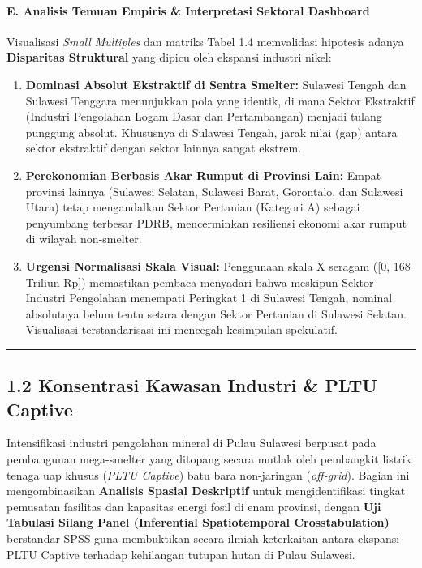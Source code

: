 \documentclass[
]{article}
\providecommand{\tightlist}{%
  \setlength{\itemsep}{0pt}\setlength{\parskip}{0pt}}
\begin{document}
\paragraph{E. Analisis Temuan Empiris \& Interpretasi Sektoral
Dashboard}\label{e.-analisis-temuan-empiris-interpretasi-sektoral-dashboard}

Visualisasi \emph{Small Multiples} dan matriks Tabel 1.4 memvalidasi
hipotesis adanya \textbf{Disparitas Struktural} yang dipicu oleh
ekspansi industri nikel:

\begin{enumerate}
\def\labelenumi{\arabic{enumi}.}
\tightlist
\item
  \textbf{Dominasi Absolut Ekstraktif di Sentra Smelter:} Sulawesi
  Tengah dan Sulawesi Tenggara menunjukkan pola yang identik, di mana
  Sektor Ekstraktif (Industri Pengolahan Logam Dasar dan Pertambangan)
  menjadi tulang punggung absolut. Khususnya di Sulawesi Tengah, jarak
  nilai (gap) antara sektor ekstraktif dengan sektor lainnya sangat
  ekstrem.
\item
  \textbf{Perekonomian Berbasis Akar Rumput di Provinsi Lain:} Empat
  provinsi lainnya (Sulawesi Selatan, Sulawesi Barat, Gorontalo, dan
  Sulawesi Utara) tetap mengandalkan Sektor Pertanian (Kategori A)
  sebagai penyumbang terbesar PDRB, mencerminkan resiliensi ekonomi akar
  rumput di wilayah non-smelter.
\item
  \textbf{Urgensi Normalisasi Skala Visual:} Penggunaan skala X seragam
  ({[}0, 168 Triliun Rp{]}) memastikan pembaca menyadari bahwa meskipun
  Sektor Industri Pengolahan menempati Peringkat 1 di Sulawesi Tengah,
  nominal absolutnya belum tentu setara dengan Sektor Pertanian di
  Sulawesi Selatan. Visualisasi terstandarisasi ini mencegah kesimpulan
  spekulatif.
\end{enumerate}

\begin{center}\rule{0.5\linewidth}{0.5pt}\end{center}

\subsection{1.2 Konsentrasi Kawasan Industri \& PLTU
Captive}\label{konsentrasi-kawasan-industri-pltu-captive}

Intensifikasi industri pengolahan mineral di Pulau Sulawesi berpusat
pada pembangunan mega-smelter yang ditopang secara mutlak oleh
pembangkit listrik tenaga uap khusus (\emph{PLTU Captive}) batu bara
non-jaringan (\emph{off-grid}). Bagian ini mengombinasikan
\textbf{Analisis Spasial Deskriptif} untuk mengidentifikasi tingkat
pemusatan fasilitas dan kapasitas energi fosil di enam provinsi, dengan
\textbf{Uji Tabulasi Silang Panel (Inferential Spatiotemporal
Crosstabulation)} berstandar SPSS guna membuktikan secara ilmiah
keterkaitan antara ekspansi PLTU Captive terhadap kehilangan tutupan
hutan di Pulau Sulawesi.
\end{document}
